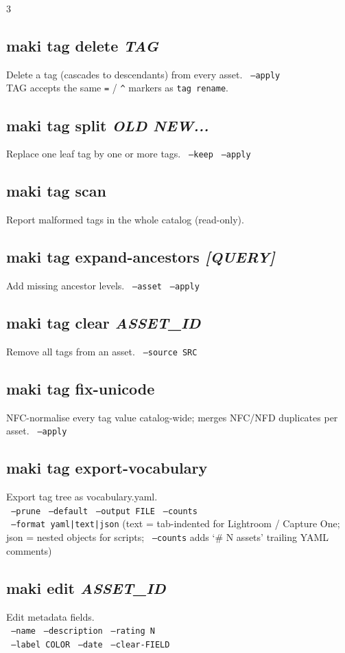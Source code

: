 \documentclass[a4paper,landscape,8pt]{article}
\newcommand{\cmd}[1]{\texttt{\footnotesize #1}}
\newcommand{\opt}[1]{\texttt{\scriptsize\color{maki-stone} #1}}
\begin{document}
\begin{multicols}{3}
\subsection{maki tag delete \textit{TAG}}
Delete a tag (cascades to descendants) from every asset. \opt{--apply} \\
TAG accepts the same \cmd{=} / \cmd{\textasciicircum} markers as \cmd{tag rename}.

\subsection{maki tag split \textit{OLD NEW...}}
Replace one leaf tag by one or more tags. \opt{--keep} \opt{--apply}

\subsection{maki tag scan}
Report malformed tags in the whole catalog (read-only).

\subsection{maki tag expand-ancestors \textit{[QUERY]}}
Add missing ancestor levels. \opt{--asset} \opt{--apply}

\subsection{maki tag clear \textit{ASSET\_ID}}
Remove all tags from an asset. \opt{--source SRC}

\subsection{maki tag fix-unicode}
NFC-normalise every tag value catalog-wide; merges NFC/NFD duplicates per asset. \opt{--apply}

\subsection{maki tag export-vocabulary}
Export tag tree as vocabulary.yaml. \\
\opt{--prune} \opt{--default} \opt{--output FILE} \opt{--counts} \\
\opt{--format yaml|text|json} (text = tab-indented for Lightroom / Capture One; json = nested objects for scripts; \opt{--counts} adds `\# N assets' trailing YAML comments)

\subsection{maki edit \textit{ASSET\_ID}}
Edit metadata fields. \\
\opt{--name} \opt{--description} \opt{--rating N} \\
\opt{--label COLOR} \opt{--date} \opt{--clear-FIELD}


\end{multicols}
\end{document}
